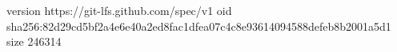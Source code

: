 version https://git-lfs.github.com/spec/v1
oid sha256:82d29cd5bf2a4e6e40a2ed8fac1dfea07c4c8e93614094588defeb8b2001a5d1
size 246314

